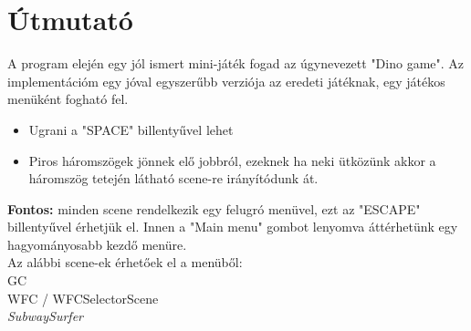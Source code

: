 \chapter{Útmutató}
A program elején egy jól ismert mini-játék fogad az úgynevezett "Dino game". Az implementációm egy jóval egyszerűbb verziója az eredeti játéknak, egy játékos menüként fogható fel.
\begin{itemize}
    \label{item:dino-runner-utmutato}
        \item Ugrani a "SPACE" billentyűvel lehet
        \item Piros háromszögek jönnek elő jobbról, ezeknek ha neki ütközünk akkor a háromszög tetején látható scene-re irányítódunk át.
\end{itemize}
\textbf{Fontos:} minden scene rendelkezik egy felugró menüvel, ezt az "ESCAPE" billentyűvel érhetjük el. Innen a "Main menu" gombot lenyomva áttérhetünk egy hagyományosabb kezdő menüre.\\
Az alábbi scene-ek érhetőek el a menüből:\\
GC\\
WFC / WFCSelectorScene\\
\textit{SubwaySurfer}
